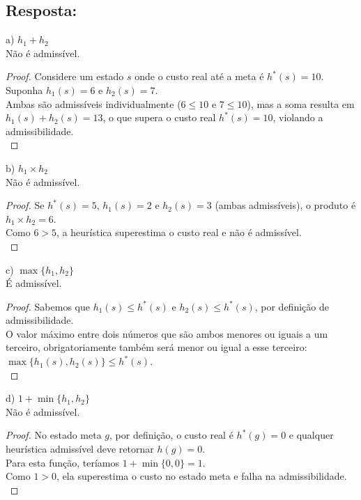 \documentclass[a4paper,12pt]{article}
\begin{document}
\subsection*{Resposta:}

\bigskip


a) $h_1 + h_2$\\

Não é admissível.

\begin{proof}
Considere um estado $s$ onde o custo real até a meta é $h^*(s) = 10$. \\
Suponha $h_1(s) = 6$ e $h_2(s) = 7$. \\
Ambas são admissíveis individualmente ($6 \leq 10$ e $7 \leq 10$), mas a soma resulta em $h_1(s) + h_2(s) = 13$, o que supera o custo real $h^*(s) = 10$, violando a admissibilidade. \\
\end{proof}

b) $h_1 \times h_2$\\

Não é admissível.  

\begin{proof}
Se $h^*(s) = 5$, $h_1(s) = 2$ e $h_2(s) = 3$ (ambas admissíveis), o produto é $h_1 \times h_2 = 6$. \\
Como $6 > 5$, a heurística superestima o custo real e não é admissível.\\
\end{proof} 

c) $\max\{h_1, h_2\}$\\

É admissível.

\begin{proof}
Sabemos que $h_1(s) \leq h^*(s)$ e $h_2(s) \leq h^*(s)$, por definição de admissibilidade. \\
O valor máximo entre dois números que são ambos menores ou iguais a um terceiro, obrigatoriamente também será menor ou igual a esse terceiro: $\max\{h_1(s), h_2(s)\} \leq h^*(s)$. \\
\end{proof}  

d) $1 + \min\{h_1, h_2\}$\\

Não é admissível.

\begin{proof}
No estado meta $g$, por definição, o custo real é $h^*(g) = 0$ e qualquer heurística admissível deve retornar $h(g) = 0$.\\
Para esta função, teríamos $1 + \min\{0, 0\} = 1$. \\
Como $1 > 0$, ela superestima o custo no estado meta e falha na admissibilidade.\\
\end{proof}  
\end{document}
